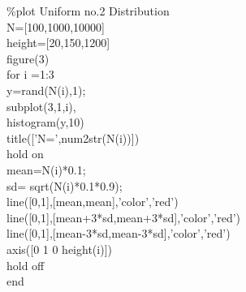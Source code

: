 \documentclass[twoside,twocolumn]{article}
\begin{document}
\begin{itshape}
\%plot Uniform no.2 Distribution\\
N=[100,1000,10000]\\
height=[20,150,1200]\\
figure(3)\\
for i =1:3 \\
	y=rand(N(i),1);\\
	subplot(3,1,i),\\
	histogram(y,10)\\
	title(['N=',num2str(N(i))])\\
	hold on\\
	mean=N(i)*0.1;\\
	sd= sqrt(N(i)*0.1*0.9);\\
	line([0,1],[mean,mean],'color','red')\\
	line([0,1],[mean+3*sd,mean+3*sd],'color','red')\\
	line([0,1],[mean-3*sd,mean-3*sd],'color','red')\\
	axis([0 1 0 height(i)])\\
	hold off\\
end\\
\end{itshape}
\end{document}

